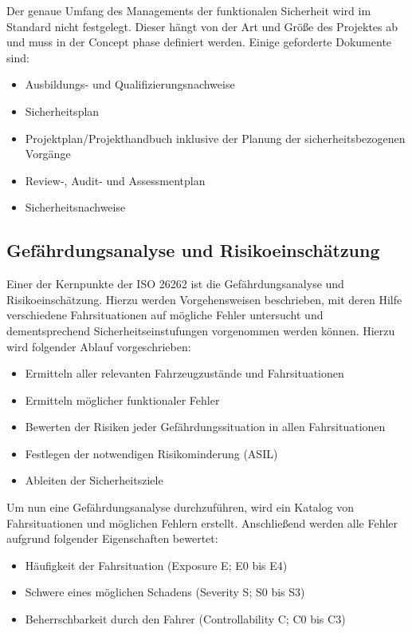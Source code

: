 \documentclass[
  a4paper,					    %
  twoside,
  DIV=calc,     				%
  bibliography=totoc,
  cleardoublepage=empty,
  ngerman,     					%
  final       					%
]{scrbook}
\begin{document}
Der genaue Umfang des Managements der funktionalen Sicherheit wird im Standard nicht festgelegt. Dieser hängt von der Art und Größe des Projektes ab und muss in der Concept phase definiert werden. Einige geforderte Dokumente sind:

\begin{itemize}
    \item Ausbildungs- und Qualifizierungsnachweise
    \item Sicherheitsplan
    \item Projektplan/Projekthandbuch inklusive der Planung der sicherheitsbezogenen Vorgänge
    \item Review-, Audit- und Assessmentplan
    \item Sicherheitsnachweise
\end{itemize}

\subsection{Gefährdungsanalyse und Risikoeinschätzung}
\label{sec:ISO26262_GundR}
Einer der Kernpunkte der ISO 26262 ist die Gefährdungsanalyse und Risikoeinschätzung. Hierzu werden Vorgehensweisen beschrieben, mit deren Hilfe verschiedene Fahrsituationen auf mögliche Fehler untersucht und dementsprechend Sicherheitseinstufungen vorgenommen werden können. Hierzu wird folgender Ablauf vorgeschrieben:

\begin{itemize}
    \item Ermitteln aller relevanten Fahrzeugzustände und Fahrsituationen
    \item Ermitteln möglicher funktionaler Fehler
    \item Bewerten der Risiken jeder Gefährdungssituation in allen Fahrsituationen
    \item Festlegen der notwendigen Risikominderung (ASIL)
    \item Ableiten der Sicherheitsziele
\end{itemize}

Um nun eine Gefährdungsanalyse durchzuführen, wird ein Katalog von Fahrsituationen und möglichen Fehlern erstellt. Anschließend werden alle Fehler aufgrund folgender Eigenschaften bewertet:

\begin{itemize}
    \item Häufigkeit der Fahrsituation (Exposure E; E0 bis E4)
    \item Schwere eines möglichen Schadens (Severity S; S0 bis S3)
    \item Beherrschbarkeit durch den Fahrer (Controllability C; C0 bis C3)
\end{itemize}
\end{document}
